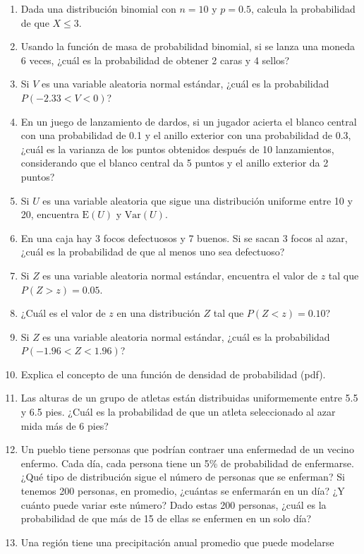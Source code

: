 \documentclass[
  letterpaper,
  DIV=11,
  numbers=noendperiod]{scrartcl}
\begin{document}
\begin{enumerate}
\item
  Dada una distribución binomial con \(n = 10\) y \(p = 0.5\), calcula
  la probabilidad de que \(X \leq 3\).
\item
  Usando la función de masa de probabilidad binomial, si se lanza una
  moneda 6 veces, ¿cuál es la probabilidad de obtener 2 caras y 4
  sellos?
\item
  Si \(V\) es una variable aleatoria normal estándar, ¿cuál es la
  probabilidad \(P(-2.33 < V < 0)\)?
\item
  En un juego de lanzamiento de dardos, si un jugador acierta el blanco
  central con una probabilidad de 0.1 y el anillo exterior con una
  probabilidad de 0.3, ¿cuál es la varianza de los puntos obtenidos
  después de 10 lanzamientos, considerando que el blanco central da 5
  puntos y el anillo exterior da 2 puntos?
\item
  Si \(U\) es una variable aleatoria que sigue una distribución uniforme
  entre 10 y 20, encuentra \(\text{E}(U)\) y \(\text{Var}(U)\).
\item
  En una caja hay 3 focos defectuosos y 7 buenos. Si se sacan 3 focos al
  azar, ¿cuál es la probabilidad de que al menos uno sea defectuoso?
\item
  Si \(Z\) es una variable aleatoria normal estándar, encuentra el valor
  de \(z\) tal que \(P(Z > z) = 0.05\).
\item
  ¿Cuál es el valor de \(z\) en una distribución \(Z\) tal que
  \(P(Z < z) = 0.10\)?
\item
  Si \(Z\) es una variable aleatoria normal estándar, ¿cuál es la
  probabilidad \(P(-1.96 < Z < 1.96)\)?
\item
  Explica el concepto de una función de densidad de probabilidad (pdf).
\item
  Las alturas de un grupo de atletas están distribuidas uniformemente
  entre 5.5 y 6.5 pies. ¿Cuál es la probabilidad de que un atleta
  seleccionado al azar mida más de 6 pies?
\item
  Un pueblo tiene personas que podrían contraer una enfermedad de un
  vecino enfermo. Cada día, cada persona tiene un 5\% de probabilidad de
  enfermarse. ¿Qué tipo de distribución sigue el número de personas que
  se enferman? Si tenemos 200 personas, en promedio, ¿cuántas se
  enfermarán en un día? ¿Y cuánto puede variar este número? Dado estas
  200 personas, ¿cuál es la probabilidad de que más de 15 de ellas se
  enfermen en un solo día?
\item
  Una región tiene una precipitación anual promedio que puede modelarse

\end{enumerate}
\end{document}
